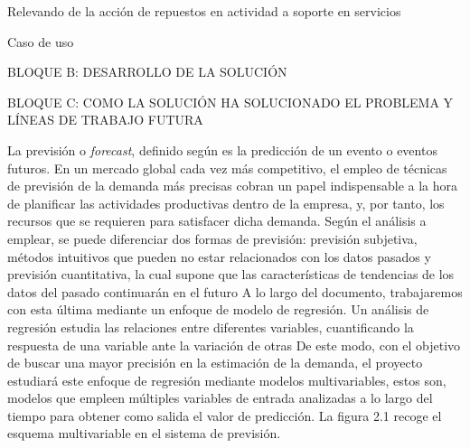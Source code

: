 Relevando de la acción de repuestos en actividad a soporte en servicios

Caso de uso

BLOQUE B: DESARROLLO DE LA SOLUCIÓN

BLOQUE C: COMO LA SOLUCIÓN HA SOLUCIONADO EL PROBLEMA Y LÍNEAS DE TRABAJO FUTURA








La previsión o \textit{forecast}, definido según  es la predicción de un evento o eventos futuros. En un mercado global cada vez más competitivo, el empleo de técnicas de previsión de la demanda más precisas cobran un papel indispensable a la hora de planificar las actividades productivas dentro de la empresa, y, por tanto, los recursos que se requieren para satisfacer dicha demanda. Según el análisis a emplear, se puede diferenciar dos formas de previsión: previsión subjetiva, métodos intuitivos que pueden no estar relacionados con los datos pasados y previsión cuantitativa, la cual supone que las características de tendencias de los datos del pasado continuarán en el futuro  A lo largo del documento, trabajaremos con esta última mediante un enfoque de modelo de regresión. Un análisis de regresión estudia las relaciones entre diferentes variables, cuantificando la respuesta de una variable ante la variación de otras  De este modo, con el objetivo de buscar una mayor precisión en la estimación de la demanda, el proyecto estudiará este enfoque de regresión mediante modelos multivariables, estos son, modelos que empleen múltiples variables de entrada analizadas a lo largo del tiempo para obtener como salida el valor de predicción. La figura 2.1 recoge el esquema multivariable en el sistema de previsión.
